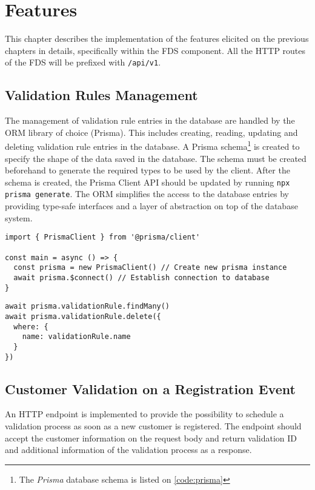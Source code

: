 \section{Features}

  This chapter describes the implementation of the features elicited on the previous chapters in details, specifically within the FDS component. All the HTTP routes of the FDS will be prefixed with \verb;/api/v1;.

  \subsection{Validation Rules Management} 
    The management of validation rule entries in the database are handled by the ORM library of choice (Prisma). This includes creating, reading, updating and deleting validation rule entries in the database. A Prisma schema\footnote{The \emph{Prisma} database schema is listed on \autoref{code:prisma}} is created to specify the shape of the data saved in the database. The schema must be created beforehand to generate the required types to be used by the client. After the schema is created, the Prisma Client API should be updated by running \verb;npx prisma generate;. The ORM simplifies the access to the database entries by providing type-safe interfaces and a layer of abstraction on top of the database system. 

  \newpage
  \begin{lstlisting}[style=es6, caption={Establishing database connection with Prisma (TypeScript)}]
import { PrismaClient } from '@prisma/client'

const main = async () => {
  const prisma = new PrismaClient() // Create new prisma instance
  await prisma.$connect() // Establish connection to database
}
  \end{lstlisting}  

  \begin{lstlisting}[style=es6, caption={Example usage of Prisma (TypeScript)}]
await prisma.validationRule.findMany()
await prisma.validationRule.delete({
  where: {
    name: validationRule.name
  }
})
  \end{lstlisting}

  \subsection{Customer Validation on a Registration Event}

    An HTTP endpoint is implemented to provide the possibility to schedule a validation process as soon as a new customer is registered. The endpoint should accept the customer information on the request body and return validation ID and additional information of the validation process as a response. 
    
